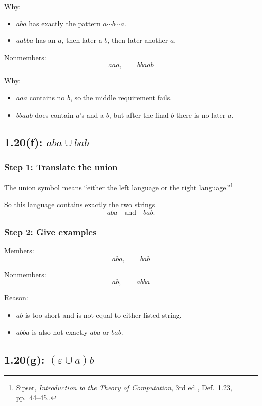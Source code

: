 \documentclass[12pt]{article}
\newcommand{\sipser}[1]{\footnote{Sipser, \emph{Introduction to the Theory of Computation}, 3rd ed., #1.}}
\begin{document}
Why:
\begin{itemize}[itemsep=0.3em]
    \item \(aba\) has exactly the pattern \(a\cdots b\cdots a\).
    \item \(aabba\) has an \(a\), then later a \(b\), then later another \(a\).
\end{itemize}

Nonmembers:
\[
aaa,\qquad bbaab
\]

Why:
\begin{itemize}[itemsep=0.3em]
    \item \(aaa\) contains no \(b\), so the middle requirement fails.
    \item \(bbaab\) does contain \(a\)'s and a \(b\), but after the final \(b\) there is no later \(a\).
\end{itemize}

\subsection*{1.20(f): \(aba \cup bab\)}

\subsubsection*{Step 1: Translate the union}

The union symbol means ``either the left language or the right language.''\sipser{Def.~1.23, pp.~44--45.}

So this language contains exactly the two strings
\[
aba \quad \text{and} \quad bab.
\]

\subsubsection*{Step 2: Give examples}

Members:
\[
aba,\qquad bab
\]

Nonmembers:
\[
ab,\qquad abba
\]

Reason:
\begin{itemize}[itemsep=0.3em]
    \item \(ab\) is too short and is not equal to either listed string.
    \item \(abba\) is also not exactly \(aba\) or \(bab\).
\end{itemize}

\subsection*{1.20(g): \((\varepsilon \cup a)b\)}
\end{document}

